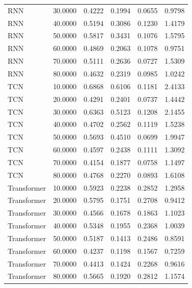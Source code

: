 \begin{tabular}{lrrrrr}
RNN & 30.0000 & 0.4222 & 0.1994 & 0.0655 & 0.9798 \\
RNN & 40.0000 & 0.5194 & 0.3086 & 0.1230 & 1.4179 \\
RNN & 50.0000 & 0.5817 & 0.3431 & 0.1076 & 1.5795 \\
RNN & 60.0000 & 0.4869 & 0.2063 & 0.1078 & 0.9751 \\
RNN & 70.0000 & 0.5111 & 0.2636 & 0.0727 & 1.5309 \\
RNN & 80.0000 & 0.4632 & 0.2319 & 0.0985 & 1.0242 \\
TCN & 10.0000 & 0.6868 & 0.6106 & 0.1181 & 2.4133 \\
TCN & 20.0000 & 0.4291 & 0.2401 & 0.0737 & 1.4442 \\
TCN & 30.0000 & 0.6363 & 0.5123 & 0.1208 & 2.1455 \\
TCN & 40.0000 & 0.4702 & 0.2562 & 0.1119 & 1.5238 \\
TCN & 50.0000 & 0.5693 & 0.4510 & 0.0699 & 1.9947 \\
TCN & 60.0000 & 0.4597 & 0.2438 & 0.1111 & 1.3092 \\
TCN & 70.0000 & 0.4154 & 0.1877 & 0.0758 & 1.1497 \\
TCN & 80.0000 & 0.4768 & 0.2270 & 0.0893 & 1.6108 \\
Transformer & 10.0000 & 0.5923 & 0.2238 & 0.2852 & 1.2958 \\
Transformer & 20.0000 & 0.5795 & 0.1751 & 0.2708 & 0.9412 \\
Transformer & 30.0000 & 0.4566 & 0.1678 & 0.1863 & 1.1023 \\
Transformer & 40.0000 & 0.5348 & 0.1955 & 0.2368 & 1.0039 \\
Transformer & 50.0000 & 0.5187 & 0.1413 & 0.2486 & 0.8591 \\
Transformer & 60.0000 & 0.4237 & 0.1198 & 0.1567 & 0.7259 \\
Transformer & 70.0000 & 0.4413 & 0.1424 & 0.2268 & 0.9616 \\
Transformer & 80.0000 & 0.5665 & 0.1920 & 0.2812 & 1.1574 \\
\bottomrule
\end{tabular}
